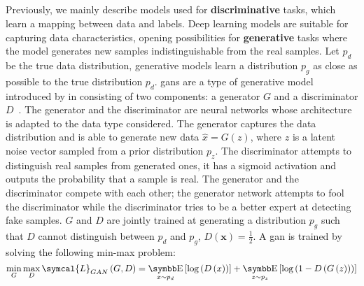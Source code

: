 \documentclass[../main.tex]{subfiles}
\begin{document}
	\subsection{}
		Previously, we mainly describe models used for \textbf{discriminative} tasks, which learn a mapping between data and labels.
		Deep learning models are suitable for capturing data characteristics, opening possibilities for \textbf{generative} tasks where the model generates new samples indistinguishable from the real samples.
		Let \(p_{d}\) be the true data distribution, generative models learn a distribution \(p_{g}\) as close as possible to the true distribution \(p_{d}\).
		\Glspl{gan} are a type of generative model introduced by \citeauthor{Goodfellow2014GAN} in \citeyear{Goodfellow2014GAN} consisting of two components: a generator \(G\) and a discriminator \(D\)~\cite{Goodfellow2014GAN}.
		The generator and the discriminator are neural networks whose architecture is adapted to the data type considered.
		The generator captures the data distribution and is able to generate new data \(\hat{x} = G\left(z\right)\), where \(z\) is a latent noise vector sampled from a prior distribution \(p_z\).
		The discriminator attempts to distinguish real samples from generated ones, it has a sigmoid activation and outputs the probability that a sample is real.
		The generator and the discriminator compete with each other; the generator network attempts to fool the discriminator while the discriminator tries to be a better expert at detecting fake samples.
		\(G\) and \(D\) are jointly trained at generating a distribution \(p_{g}\) such that \(D\) cannot distinguish between \(p_{d}\) and \(p_{g}\), \ie{}\(D\left(\symbf{x}\right) = \tfrac12\).
		A \gls{gan} is trained by solving the following min-max problem:
		\begin{equation}
			\min_{G} \max_{D} \symcal{L}_{GAN}\left(G,D\right) = \E_{x\sim p_{d}}\left[ \log\left(D\left(x\right)\right)\right] + \E_{z\sim p_{z}}\left[ \log\left( 1 - D\left(G\left(z\right)\right)\right)\right] \label{eq:gan_loss}
		\end{equation}
\end{document}
